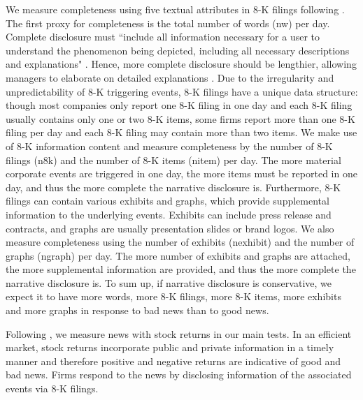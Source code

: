 \documentclass[letterpaper,12pt]{article}
\begin{document}
\begin{spacing}{1.5}
We measure completeness using five textual attributes in 8-K filings following . The first proxy for completeness is the total number of words (nw) per day. Complete disclosure must ``include all information necessary for a user to understand the phenomenon being depicted, including all necessary descriptions and explanations" \cite[QC12]{fasbConceptualFrameworkFinancial2018}. Hence, more complete disclosure should be lengthier, allowing managers to elaborate on detailed explanations \cite{leuzDisclosureCostCapital2009}. Due to the irregularity and unpredictability of 8-K triggering events, 8-K filings have a unique data structure: though most companies only report one 8-K filing in one day and each 8-K filing usually contains only one or two 8-K items, some firms report more than one 8-K filing per day and each 8-K filing may contain more than two items. We make use of 8-K information content and measure completeness by the number of 8-K filings (n8k) and the number of 8-K items (nitem) per day. The more material corporate events are triggered in one day, the more items must be reported in one day, and thus the more complete the narrative disclosure is. Furthermore, 8-K filings can contain various exhibits and graphs, which provide supplemental information to the underlying events. Exhibits can include press release and contracts, and graphs are usually presentation slides or brand logos. We also measure completeness using the number of exhibits (nexhibit) and the number of graphs (ngraph) per day. The more number of exhibits and graphs are attached, the more supplemental information are provided, and thus the more complete the narrative disclosure is.
To sum up, if narrative disclosure is conservative, we expect it to have more words, more 8-K filings, more 8-K items, more exhibits and more graphs in response to bad news than to good news.

Following , we measure news with stock returns in our main tests.
In an efficient market, stock returns incorporate public and private information in a timely manner and therefore positive and negative returns are indicative of good and bad news.
Firms respond to the news by disclosing information of the associated events via 8-K filings. 


\end{spacing}
\end{document}
